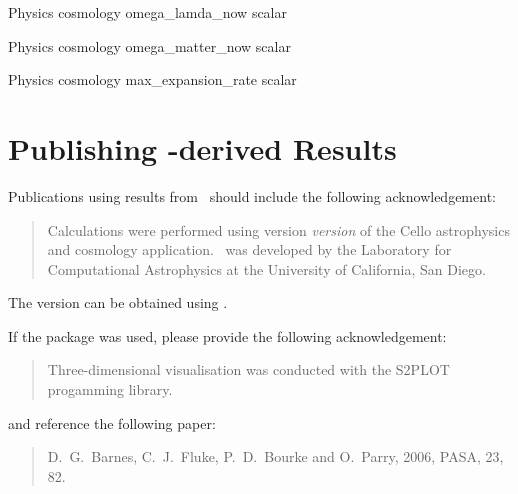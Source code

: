\documentclass{article}
\begin{document}
\Parameter
{Physics}
{cosmology}
{omega\_lamda\_now}
{scalar}
{}
{}
{}
{}

\Parameter
{Physics}
{cosmology}
{omega\_matter\_now}
{scalar}
{}
{}
{}
{}

\Parameter
{Physics}
{cosmology}
{max\_expansion\_rate}
{scalar}
{}
{}
{}
{}

\section{Publishing \cello-derived Results}

Publications using results from \cello\ should include the following
acknowledgement:

\begin{quotation}
Calculations were performed using version \textit{version} of the
Cello astrophysics and cosmology application.  \cello\ was developed
by the Laboratory for Computational Astrophysics at the University of
California, San Diego.
\end{quotation}


The version can be obtained using .  


If the  package was used, please provide the following
acknowledgement:

\begin{quotation}
  Three-dimensional visualisation was conducted with the S2PLOT
   progamming library.
\end{quotation}

and reference the following paper:

\begin{quotation}
  D.~G.~Barnes, C.~J.~Fluke, P.~D.~Bourke and O.~Parry, 2006, PASA, 23, 82.
\end{quotation}
\end{document}
